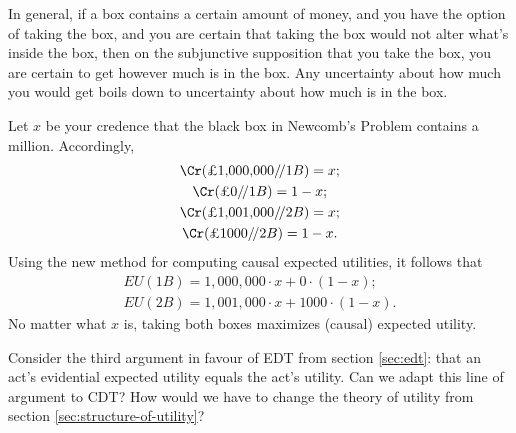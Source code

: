 In general, if a box contains a certain amount of money, and you have
the option of taking the box, and you are certain that taking the box
would not alter what's inside the box, then on the subjunctive
supposition that you take the box, you are certain to get however much
is in the box. Any uncertainty about how much you would get
boils down to uncertainty about how much is in the box.

Let $x$ be your credence that the black box in Newcomb's Problem
contains a million. Accordingly,
\begin{gather*}
  \Cr(\text{£1,000,000}/\!/1B) = x;\\
  \Cr(\text{£0}/\!/1B) = 1-x;\\
  \Cr(\text{£1,001,000}/\!/2B) = x;\\
  \Cr(\text{£1000}/\!/2B) = 1-x.
\end{gather*}
Using the new method for computing causal expected utilities, it follows that
\begin{gather*}
  EU(1B) = 1,000,000 \cdot x + 0 \cdot (1-x);\\
  EU(2B) = 1,001,000 \cdot x + 1000 \cdot (1-x).
\end{gather*}
No matter what $x$ is, taking both boxes maximizes (causal) expected
utility.


\begin{exercise}{3}
  Consider the third argument in favour of EDT from section
  \ref{sec:edt}: that an act's evidential expected utility equals the
  act's utility. Can we adapt this line of argument to CDT? How would
  we have to change the theory of utility from section
  \ref{sec:structure-of-utility}? 
\end{exercise}




